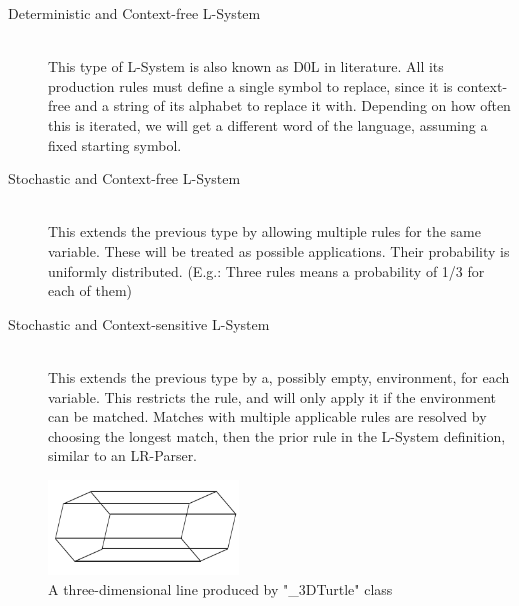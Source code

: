 \documentclass[11pt,a4paper]{article}
\begin{document}
\begin{description}

\item[Deterministic and Context-free L-System]\hfill \\
This type of L-System is also known as D0L in literature. All its production rules must define a single symbol to replace, since it is  context-free and a string of its alphabet to replace it with. Depending on how often this is iterated, we will get a different word of the language, assuming a fixed starting symbol. 
\item[Stochastic and Context-free L-System]\hfill \\
This extends the previous type by allowing multiple rules for the same variable. These will be treated as possible applications. Their probability is uniformly distributed. (E.g.: Three rules means a probability of 1/3 for each of them)
\item[Stochastic and Context-sensitive L-System]\hfill \\
This extends the previous type by a, possibly empty, environment, for each variable. This restricts the rule, and will only apply it if the environment can be matched. Matches with multiple applicable rules are resolved by choosing the longest match, then the prior rule in the L-System definition, similar to an LR-Parser.
\end{description}


\begin{figure}
  \begin{center}
    \includegraphics[width=0.45\textwidth]{images/line}
  \end{center}
  \caption{A three-dimensional line produced by "\_3DTurtle" class}
  \label{fig:line}
\end{figure}
\end{document}
